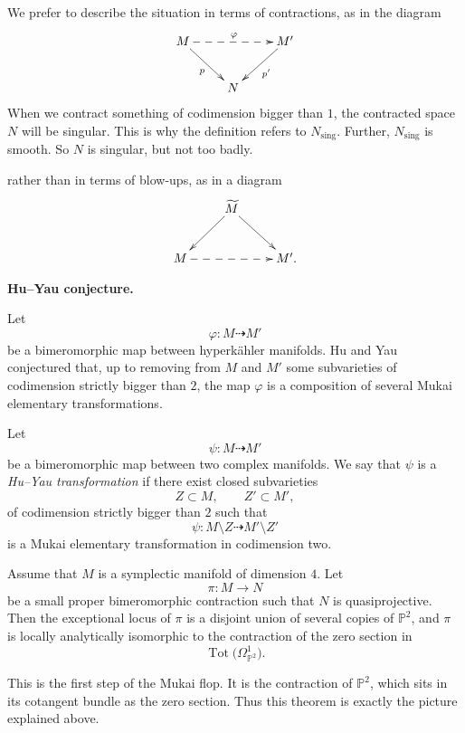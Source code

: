 \begin{remark}
\label{remark-prefer-describe}
We prefer to describe the situation in
terms of contractions, as in the
diagram
\[
\xymatrix{
M \ar@{-->}[rr]^{\varphi}
\ar[dr]_{p}
&&
M' \ar[dl]^{p'}
\\
& N &
}
\]
When we contract something of
codimension bigger than $1$, the
contracted space $N$ will be singular.
This is why the definition refers to
$N_{\mathrm{sing}}$.
Further, $N_{\mathrm{sing}}$ is
smooth.
So $N$ is singular, but not too badly.

rather than in terms of blow-ups, as
in a diagram
\[
\xymatrix{
& \widetilde M \ar[dl]\ar[dr] &\\
M \ar@{-->}[rr] && M'.
}
\]
\end{remark}

\medskip\noindent
{\bf Hu--Yau conjecture.}

Let
\[
\varphi:M\dashrightarrow M'
\]
be a bimeromorphic map between
hyperk\"ahler manifolds.
Hu and Yau conjectured that, up to
removing from $M$ and $M'$ some
subvarieties of codimension strictly
bigger than $2$, the map $\varphi$ is
a composition of several Mukai
elementary transformations.

\begin{definition}
\label{definition-let-m3-duplicate-2}
Let
\[
\psi:M\dashrightarrow M'
\]
be a bimeromorphic map between two
complex manifolds.
We say that $\psi$ is a {\it Hu--Yau
transformation} if there exist closed
subvarieties
\[
Z\subset M,
\qquad
Z'\subset M',
\]
of codimension strictly bigger than
$2$ such that
\[
\psi:M\setminus Z
\dashrightarrow
M'\setminus Z'
\]
is a Mukai elementary transformation
in codimension two.
\end{definition}

\begin{theorem}
\label{theorem-assume-m}
Assume that $M$ is a symplectic
manifold of dimension $4$.
Let
\[
\pi:M\to N
\]
be a small proper bimeromorphic
contraction such that $N$ is
quasiprojective.
Then the exceptional locus of $\pi$
is a disjoint union of several copies
of $\mathbb{P}^2$, and $\pi$ is
locally analytically isomorphic to the
contraction of the zero section in
\[
\operatorname{Tot}
\bigl(\Omega^1_{\mathbb{P}^2}\bigr).
\]
\end{theorem}

This is the first step of the Mukai
flop.
It is the contraction of
$\mathbb{P}^2$, which sits in its
cotangent bundle as the zero section.
Thus this theorem is exactly the
picture explained above.


